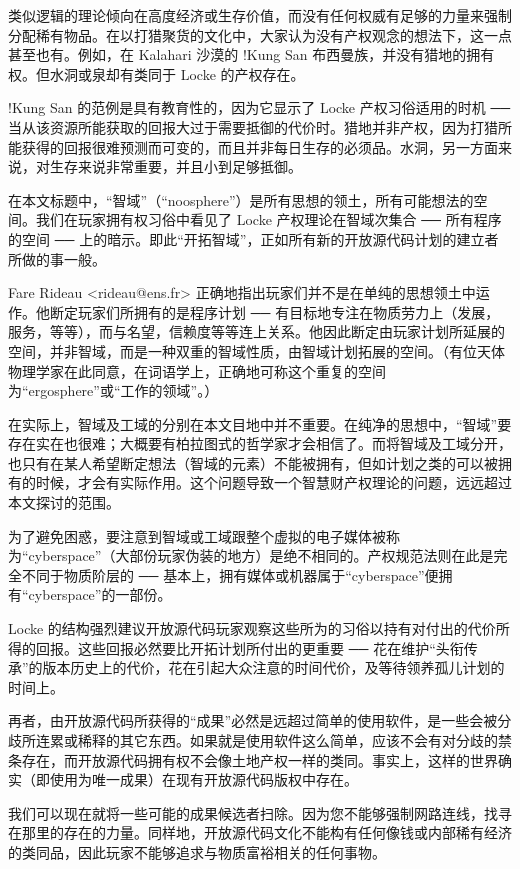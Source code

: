 类似逻辑的理论倾向在高度经济或生存价值，而没有任何权威有足够的力量来强制分配稀有物品。在以打猎聚货的文化中，大家认为没有产权观念的想法下，这一点甚至也有。例如，在 Kalahari 沙漠的 !Kung San 布西曼族，并没有猎地的拥有权。但水洞或泉却有类同于 Locke 的产权存在。

!Kung San 的范例是具有教育性的，因为它显示了 Locke 产权习俗适用的时机 ── 当从该资源所能获取的回报大过于需要抵御的代价时。猎地并非产权，因为打猎所能获得的回报很难预测而可变的，而且并非每日生存的必须品。水洞，另一方面来说，对生存来说非常重要，并且小到足够抵御。

在本文标题中，“智域”（“noosphere”）是所有思想的领土，所有可能想法的空间。我们在玩家拥有权习俗中看见了 Locke 产权理论在智域次集合 ── 所有程序的空间 ── 上的暗示。即此“开拓智域”，正如所有新的开放源代码计划的建立者所做的事一般。

Fare Rideau <rideau@ens.fr> 正确地指出玩家们并不是在单纯的思想领土中运作。他断定玩家们所拥有的是程序计划  ──  有目标地专注在物质劳力上（发展，服务，等等），而与名望，信赖度等等连上关系。他因此断定由玩家计划所延展的空间，并非智域，而是一种双重的智域性质，由智域计划拓展的空间。（有位天体物理学家在此同意，在词语学上，正确地可称这个重复的空间为“ergosphere”或“工作的领域”。）

在实际上，智域及工域的分别在本文目地中并不重要。在纯净的思想中，“智域”要存在实在也很难；大概要有柏拉图式的哲学家才会相信了。而将智域及工域分开，也只有在某人希望断定想法（智域的元素）不能被拥有，但如计划之类的可以被拥有的时候，才会有实际作用。这个问题导致一个智慧财产权理论的问题，远远超过本文探讨的范围。

为了避免困惑，要注意到智域或工域跟整个虚拟的电子媒体被称为“cyberspace”（大部份玩家伪装的地方）是绝不相同的。产权规范法则在此是完全不同于物质阶层的  ──  基本上，拥有媒体或机器属于“cyberspace”便拥有“cyberspace”的一部份。

Locke 的结构强烈建议开放源代码玩家观察这些所为的习俗以持有对付出的代价所得的回报。这些回报必然要比开拓计划所付出的更重要 ── 花在维护“头衔传承”的版本历史上的代价，花在引起大众注意的时间代价，及等待领养孤儿计划的时间上。

再者，由开放源代码所获得的“成果”必然是远超过简单的使用软件，是一些会被分歧所连累或稀释的其它东西。如果就是使用软件这么简单，应该不会有对分歧的禁条存在，而开放源代码拥有权不会像土地产权一样的类同。事实上，这样的世界确实（即使用为唯一成果）在现有开放源代码版权中存在。

我们可以现在就将一些可能的成果候选者扫除。因为您不能够强制网路连线，找寻在那里的存在的力量。同样地，开放源代码文化不能构有任何像钱或内部稀有经济的类同品，因此玩家不能够追求与物质富裕相关的任何事物。

